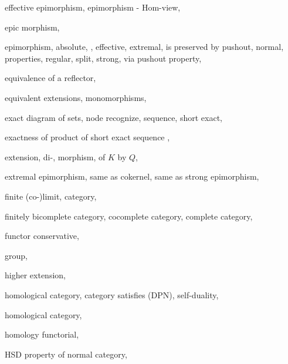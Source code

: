 \documentclass [12pt,oneside]{book}%
\theoremstyle{captionstyle}  %
\newcommand{\DPNInline}{(DPN)}																%
\begin{document}
\begin{theindex}
    \item effective
    \subitem epimorphism, 
    \subitem epimorphism - Hom-view, 
    \item epic morphism, 
    \item epimorphism, 
    \subitem absolute, , 
    \subitem effective, 
    \subitem extremal, 
    \subitem is preserved by pushout, 
    \subitem normal, 
    \subitem properties, 
    \subitem regular, 
    \subitem split, 
    \subitem strong, 
    \subitem via pushout property, 
    \item equivalence
    \subitem of a reflector, 
    \item equivalent
    \subitem extensions, 
    \subitem monomorphisms, 
    \item exact
    \subitem diagram of sets, 
    \subitem node recognize, 
    \subitem sequence, 
    \subitem short exact, 
    \item exactness
    \subitem of product of short exact sequence , 
    \item extension, 
    \subitem di-, 
    \subitem morphism, 
    \subitem of $K$ by $Q$, 
    \item extremal epimorphism, 
    \subitem same as cokernel, 
    \subitem same as strong epimorphism, 

    \indexspace

    \item finite
    \subitem (co-)limit, 
    \subitem category, 
    \item finitely
    \subitem bicomplete category, 
    \subitem cocomplete category, 
    \subitem complete category, 
    \item functor
    \subitem conservative, 

    \indexspace

    \item group, 

    \indexspace

    \item higher extension, 
    \item homological
    \subitem category, 
    \subitem category satisfies \DPNInline , 
    \subitem self-duality, 
    \item homological category, 
    \item homology
    \subitem functorial, 
    \item HSD
    \subitem property of normal category, 


\end{theindex}
\end{document}
